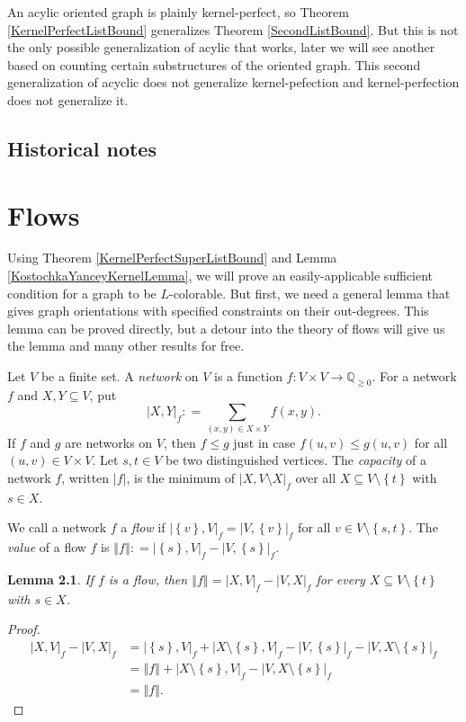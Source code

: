 \documentclass[openany]{tufte-book} %
\theoremstyle{plain}
\newtheorem{lemma}{Lemma}
\newcommand{\set}[1]{\left\{ #1 \right\}}
\newcommand{\card}[1]{\left|#1\right|}
\newcommand{\size}[1]{\left\Vert#1\right\Vert}
\newcommand{\func}[3]{#1\colon #2 \rightarrow #3}
\newcommand{\DefinedAs}{\mathrel{\mathop:}=}
\newcommand{\Q}{\mathbb{Q}}
\begin{document}
An acylic oriented graph is plainly kernel-perfect, so Theorem \ref{KernelPerfectListBound} generalizes Theorem \ref{SecondListBound}.  
But this is not the only possible generalization of acylic that works, later\marginnote{\textcolor{blue}{what chapter?}} we will see another based on counting certain substructures of the oriented graph. 
This second generalization of acyclic does not generalize kernel-pefection and kernel-perfection does not generalize it.

\section{Historical notes}

\chapter{Flows}
Using Theorem \ref{KernelPerfectSuperListBound} and Lemma \ref{KostochkaYanceyKernelLemma}, we will prove an easily-applicable sufficient condition for a graph to be $L$-colorable.  
But first, we need a general lemma that gives graph orientations with specified constraints on their out-degrees.  This lemma can be proved directly, 
but a detour into the theory of flows will give us the lemma and many other results for free.

Let $V$ be a finite set.  A \emph{network} on $V$ is a function $\func{f}{V\times V}{\Q_{\ge 0}}$.  For a network $f$ and $X,Y \subseteq V$, put
\[\card{X,Y}_f \DefinedAs \sum_{(x,y) \in X\times Y} f(x,y).\]
If $f$ and $g$ are networks on $V$, then $f \le g$ just in case $f(u,v) \le g(u,v)$ for all $(u,v)\in V\times V$.
Let $s,t \in V$ be two distinguished vertices.  The \emph{capacity} of a network $f$, written $\card{f}$, is the minimum of $\card{X, V\setminus X}_f$ over all $X \subseteq V\setminus\set{t}$ with $s \in X$.

We call a network $f$ a \emph{flow} if $\card{\set{v},V}_f = \card{V,\set{v}}_f$ for all $v \in V \setminus \set{s,t}$.
The \emph{value} of a flow $f$ is $\size{f} \DefinedAs \card{\set{s},V}_f - \card{V,\set{s}}_f$.

\begin{lemma}\label{FlowValues}
If $f$ is a flow, then $\size{f} = \card{X, V}_f - \card{V, X}_f$ for every $X \subseteq V\setminus\set{t}$ with $s \in X$.
\end{lemma}
\begin{proof}
\begin{align*}
\card{X, V}_f - \card{V, X}_f &= \card{\set{s}, V}_f + \card{X\setminus\set{s}, V}_f - \card{V, \set{s}}_f - \card{V, X\setminus\set{s}}_f\\
&= \size{f} + \card{X\setminus\set{s}, V}_f - \card{V, X\setminus\set{s}}_f\\
&= \size{f}.
\end{align*}
\end{proof}
\end{document}
